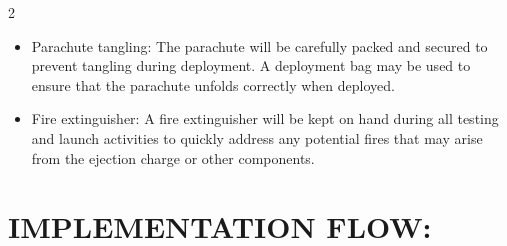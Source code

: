 \documentclass[10pt]{report}
\begin{document}
\begin{multicols}{2}
\begin{itemize}
      \item Parachute tangling: The parachute will be carefully packed and secured to prevent tangling during deployment. A deployment bag may be used to ensure that the parachute unfolds correctly when deployed. \\

        \item Fire extinguisher: A fire extinguisher will be kept on hand during all testing and launch activities to quickly address any potential fires that may arise from the ejection charge or other components. \\
  \end{itemize}
  
  \end{multicols}

  \section*{\Large IMPLEMENTATION FLOW:} 
\end{document}
